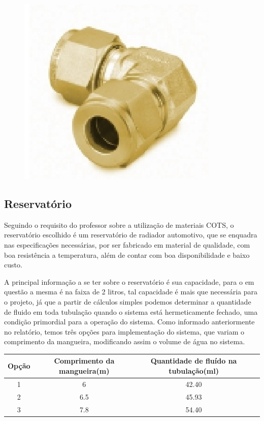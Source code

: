 \begin{figure}[!htb]                                                               
   \centering                                                                      
   \includegraphics[scale=0.6, keepaspectratio=true]{figuras/peca4.eps} 
\end{figure}

\subsection{Reservatório}

Seguindo o requisito do professor sobre a utilização de materiais COTS, o reservatório escolhido é um reservatório de radiador automotivo, que se enquadra nas especificações necessárias, por ser fabricado em material de qualidade, com boa resistência a temperatura, além de contar com boa disponibilidade e baixo custo. 

A principal informação a se ter sobre o reservatório é sua capacidade, para o em questão a mesma é na faixa de 2 litros, tal capacidade é mais que necessária para o projeto, já que a partir de cálculos simples podemos determinar a quantidade de fluido em toda tubulação quando o sistema está hermeticamente fechado, uma condição primordial para a operação do sistema. Como informado anteriormente no relatório, temos três opções para implementação do sistema, que variam o comprimento da mangueira, modificando assim o volume de água no sistema.

\begin{table}[!h]
\centering
\begin{tabular}{|c|c|c|c|}
\hline
Opção & Comprimento da mangueira(m) & Quantidade de fluído na tubulação(ml) \\
\hline
1 & 6 & 42.40 \\ \hline
2 & 6.5 & 45.93 \\ \hline
3 & 7.8 & 54.40 \\
\hline
\end{tabular}
\end{table}

